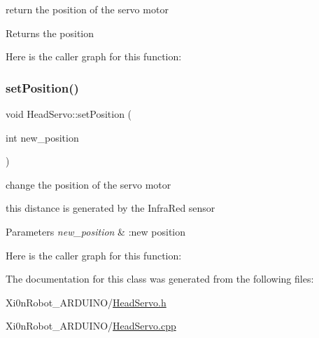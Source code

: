 return the position of the servo motor 

\begin{DoxyReturn}{Returns}
the position 
\end{DoxyReturn}
Here is the caller graph for this function\+:
\mbox{\label{class_head_servo_a43ae8a0a9b586c55cd4e59a779eea4a9}} 
\subsubsection{\texorpdfstring{set\+Position()}{setPosition()}}
{\footnotesize\ttfamily void Head\+Servo\+::set\+Position (\begin{DoxyParamCaption}\item[{int}]{new\+\_\+position }\end{DoxyParamCaption})}



change the position of the servo motor 

this distance is generated by the Infra\+Red sensor


\begin{DoxyParams}{Parameters}
{\em new\+\_\+position} & \+:new position \\
\hline
\end{DoxyParams}
Here is the caller graph for this function\+:


The documentation for this class was generated from the following files\+:\begin{DoxyCompactItemize}
\item 
Xi0n\+Robot\+\_\+\+A\+R\+D\+U\+I\+N\+O/\hyperlink{_head_servo_8h}{Head\+Servo.\+h}\item 
Xi0n\+Robot\+\_\+\+A\+R\+D\+U\+I\+N\+O/\hyperlink{_head_servo_8cpp}{Head\+Servo.\+cpp}\end{DoxyCompactItemize}
